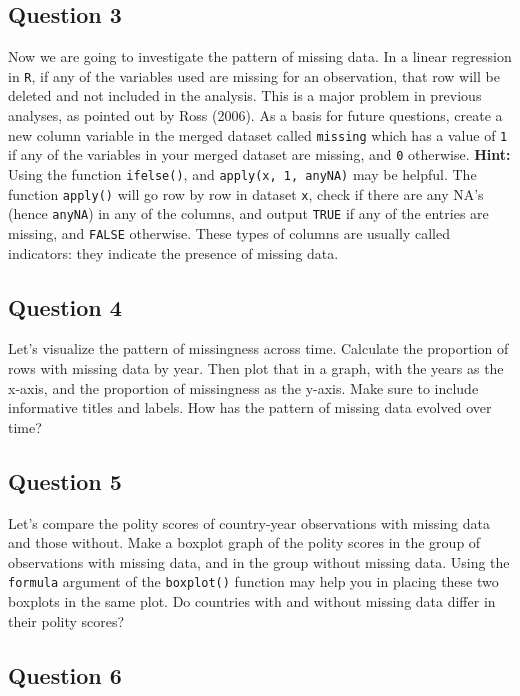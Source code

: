 \documentclass[]{article}
\begin{document}
\subsection{Question 3}\label{question-3}

Now we are going to investigate the pattern of missing data. In a linear
regression in \texttt{R}, if any of the variables used are missing for
an observation, that row will be deleted and not included in the
analysis. This is a major problem in previous analyses, as pointed out
by Ross (2006). As a basis for future questions, create a new column
variable in the merged dataset called \texttt{missing} which has a value
of \texttt{1} if any of the variables in your merged dataset are
missing, and \texttt{0} otherwise. \textbf{Hint:} Using the function
\texttt{ifelse()}, and \texttt{apply(x, 1, anyNA)} may be helpful. The
function \texttt{apply()} will go row by row in dataset \texttt{x},
check if there are any NA's (hence \texttt{anyNA}) in any of the
columns, and output \texttt{TRUE} if any of the entries are missing, and
\texttt{FALSE} otherwise. These types of columns are usually called
indicators: they indicate the presence of missing data.

\subsection{Question 4}\label{question-4}

Let's visualize the pattern of missingness across time. Calculate the
proportion of rows with missing data by year. Then plot that in a graph,
with the years as the x-axis, and the proportion of missingness as the
y-axis. Make sure to include informative titles and labels. How has the
pattern of missing data evolved over time?

\subsection{Question 5}\label{question-5}

Let's compare the polity scores of country-year observations with
missing data and those without. Make a boxplot graph of the polity
scores in the group of observations with missing data, and in the group
without missing data. Using the \texttt{formula} argument of the
\texttt{boxplot()} function may help you in placing these two boxplots
in the same plot. Do countries with and without missing data differ in
their polity scores?

\subsection{Question 6}\label{question-6}
\end{document}
